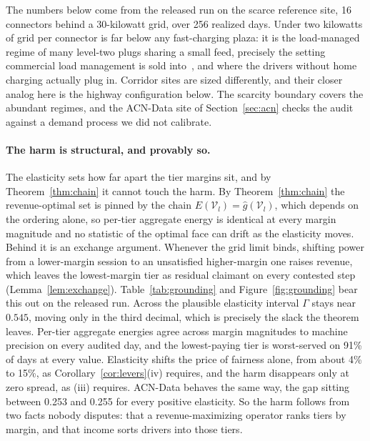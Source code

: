 \documentclass[manuscript, screen, review, anonymous]{acmart}
\begin{document}
The numbers below come from the released run on the scarce reference site, 16 connectors behind a 30-kilowatt grid, over 256 realized days. Under two kilowatts of grid per connector is far below any fast-charging plaza: it is the load-managed regime of many level-two plugs sharing a small feed, precisely the setting commercial load management is sold into~\cite{ampeco2026}, and where the drivers without home charging actually plug in. Corridor sites are sized differently, and their closer analog here is the highway configuration below. The scarcity boundary covers the abundant regimes, and the ACN-Data site of Section~\ref{sec:acn} checks the audit against a demand process we did not calibrate.

\paragraph{The harm is structural, and provably so.}
The elasticity sets how far apart the tier margins sit, and by Theorem~\ref{thm:chain} it cannot touch the harm. By Theorem~\ref{thm:chain} the revenue-optimal set is pinned by the chain $E(\mathcal{V}_l)=\hat g(\mathcal{V}_l)$, which depends on the ordering alone, so per-tier aggregate energy is identical at every margin magnitude and no statistic of the optimal face can drift as the elasticity moves. Behind it is an exchange argument. Whenever the grid limit binds, shifting power from a lower-margin session to an unsatisfied higher-margin one raises revenue, which leaves the lowest-margin tier as residual claimant on every contested step (Lemma~\ref{lem:exchange}). Table~\ref{tab:grounding} and Figure~\ref{fig:grounding} bear this out on the released run. Across the plausible elasticity interval $\Gamma$ stays near $0.545$, moving only in the third decimal, which is precisely the slack the theorem leaves. Per-tier aggregate energies agree across margin magnitudes to machine precision on every audited day, and the lowest-paying tier is worst-served on 91\% of days at every value. Elasticity shifts the price of fairness alone, from about 4\% to 15\%, as Corollary~\ref{cor:levers}(iv) requires, and the harm disappears only at zero spread, as (iii) requires. ACN-Data behaves the same way, the gap sitting between 0.253 and 0.255 for every positive elasticity. So the harm follows from two facts nobody disputes: that a revenue-maximizing operator ranks tiers by margin, and that income sorts drivers into those tiers.
\end{document}
